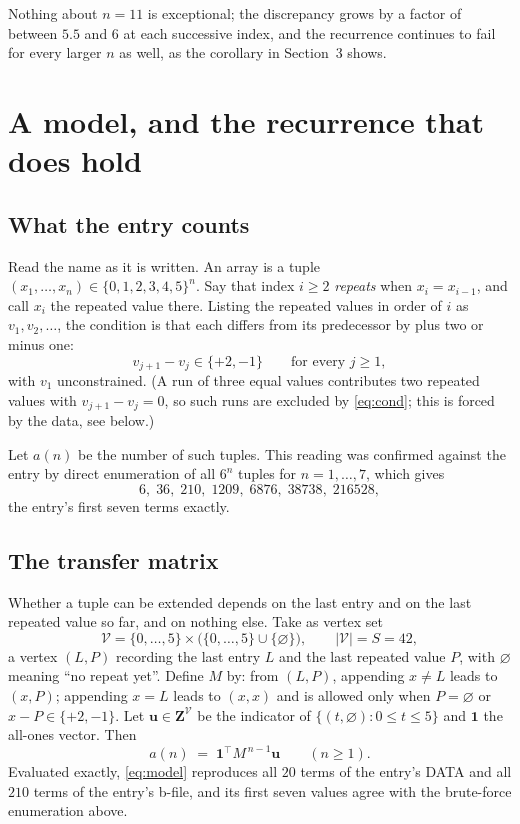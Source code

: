\documentclass[11pt,a4paper]{article}
\theoremstyle{plain}
\theoremstyle{definition}
\begin{document}
Nothing about $n=11$ is exceptional; the discrepancy grows by a factor of between
$5.5$ and $6$ at each successive index, and the recurrence continues to fail for every
larger $n$ as well, as the corollary in Section~3 shows.

\section{A model, and the recurrence that does hold}

\subsection{What the entry counts}

Read the name as it is written. An array is a tuple
$(x_1,\dots,x_n)\in\{0,1,2,3,4,5\}^{n}$. Say that index $i\ge2$ \emph{repeats} when
$x_i=x_{i-1}$, and call $x_i$ the repeated value there. Listing the repeated values in
order of $i$ as $v_1,v_2,\dots$, the condition is that each differs from its predecessor
by plus two or minus one:
\begin{equation}\label{eq:cond}
v_{j+1}-v_j\in\{+2,-1\}\qquad\text{for every } j\ge1,
\end{equation}
with $v_1$ unconstrained. (A run of three equal values contributes two repeated values
with $v_{j+1}-v_j=0$, so such runs are excluded by \eqref{eq:cond}; this is forced by the
data, see below.)

Let $a(n)$ be the number of such tuples. This reading was confirmed against the entry by
direct enumeration of all $6^{n}$ tuples for $n=1,\dots,7$, which gives
\[
6,\;36,\;210,\;1209,\;6876,\;38738,\;216528,
\]
the entry's first seven terms exactly.

\subsection{The transfer matrix}

Whether a tuple can be extended depends on the last entry and on the last repeated value
so far, and on nothing else. Take as vertex set
\[
\mathcal V=\{0,\dots,5\}\times\bigl(\{0,\dots,5\}\cup\{\varnothing\}\bigr),
\qquad |\mathcal V|=S=42,
\]
a vertex $(L,P)$ recording the last entry $L$ and the last repeated value $P$, with
$\varnothing$ meaning ``no repeat yet''. Define $M$ by: from $(L,P)$, appending
$x\ne L$ leads to $(x,P)$; appending $x=L$ leads to $(x,x)$ and is allowed only when
$P=\varnothing$ or $x-P\in\{+2,-1\}$. Let $\mathbf u\in\mathbf Z^{\mathcal V}$ be the
indicator of $\{(t,\varnothing):0\le t\le5\}$ and $\mathbf 1$ the all-ones vector. Then
\begin{equation}\label{eq:model}
a(n)\;=\;\mathbf 1^{\!\top}M^{\,n-1}\mathbf u\qquad (n\ge1).
\end{equation}
Evaluated exactly, \eqref{eq:model} reproduces all $20$ terms of the entry's DATA and all
$210$ terms of the entry's b-file, and its first seven values agree with the brute-force
enumeration above.
\end{document}
